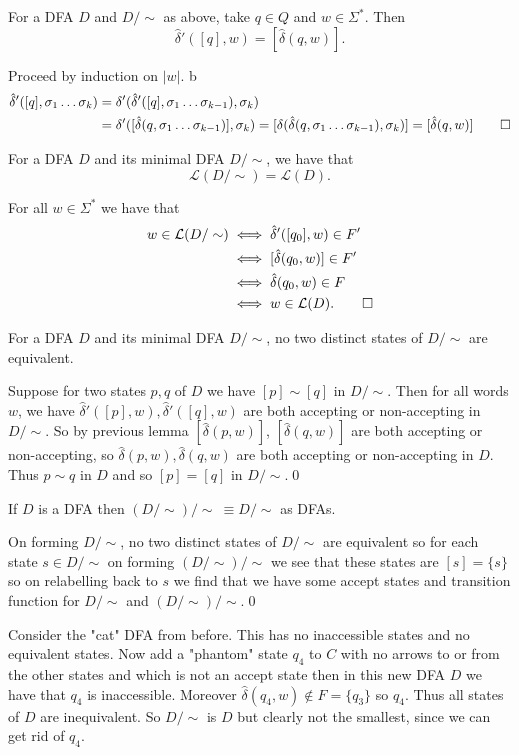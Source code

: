 \documentclass[tikx, border = 10pt]{article}
\begin{document}
\begin{lemma}
  For a DFA $ D $ and $ D/\sim $ as above, take $ q\in Q $ and $ w\in \Sigma^* $. Then
  \[
	  \hat\delta'([q],w) = [\hat\delta(q,w)].
  \]
\end{lemma}
\pf Proceed by induction on $ |w| $. b
\begin{align*}
	\hat\delta'([q],\sigma_1\dots\sigma_k) &=\delta'(\hat\delta'([q],\sigma_1\dots\sigma_{k-1}), \sigma_k) \\
					       &=\delta'([\hat\delta(q,\sigma_1\dots \sigma_{k-1})],\sigma_k)=[\delta(\hat\delta(q,\sigma_1\dots\sigma_{k-1}),\sigma_k)] = [\hat\delta(q,w)]\qed
\end{align*}
\begin{theorem}
  For a DFA $ D $ and its minimal DFA $ D/\sim $, we have that \[
    \mathcal L(D/\sim) = \mathcal L(D).
  \]
\end{theorem}
\pf For all $ w\in \Sigma^* $ we have that 
\begin{align*}
	w\in \mathcal L(D/\sim) &\iff \hat\delta'([q_0],w) \in F'\\
				&\iff [\hat\delta(q_0,w)] \in F' \\
				&\iff \hat\delta(q_0,w) \in F \\
				&\iff w\in \mathcal L(D).\qed
\end{align*}
\begin{lemma}
  For a DFA $ D $ and its minimal DFA $ D/\sim $, no two distinct states of $ D/\sim $ are equivalent.
\end{lemma}
\pf Suppose for two states $ p,q $ of $ D $ we have $ [p]\sim [q] $ in $ D/\sim $. Then for all words $ w $, we have $ \hat\delta'([p],w), \hat\delta'([q],w) $ are both accepting or non-accepting in $ D/\sim $. So by previous lemma $ [\hat \delta(p,w)] $, $ [\hat\delta(q,w)] $ are both accepting or non-accepting, so $ \hat\delta(p,w), \hat\delta(q,w) $ are both accepting or non-accepting in $ D $. Thus $ p\sim q $ in $ D $ and so $ [p]=[q] $ in $ D/\sim $.\qed
\begin{corollary}
  If $ D $ is a DFA then $ (D/\sim)/\sim\ \equiv D/\sim $ as DFAs.
\end{corollary}
\pf On forming $ D/\sim $, no two distinct states of $ D/\sim $ are equivalent so for each state $ s\in D/\sim $ on forming $(D/\sim)/\sim $ we see that these states are $ [s] = \{s\} $ so on relabelling back to $ s $ we find that we have some accept states and transition function for $ D/\sim $ and $ (D/\sim)/\sim $.\qed
\begin{example}
	Consider the "cat" DFA from before. This has no inaccessible states and no equivalent states. Now add a "phantom" state $ q_4 $ to $ C $ with no arrows to or from the other states and which is not an accept state then in this new DFA $ D $ we have that $ q_4 $ is inaccessible. Moreover $ \hat\delta(q_4,w)\notin F= \{q_3\} $ so $ q_4 $. Thus all states of $ D $ are inequivalent. So $ D/\sim $ is $ D $ but clearly not the smallest, since we can get rid of $ q_4 $. 
\end{example}
\end{document}
